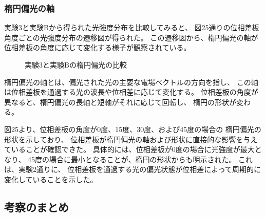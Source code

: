 \documentclass{article}
\begin{document}
\subsubsection*{楕円偏光の軸}
\begin{spacing}{1.2}
    実験3と実験Bから得られた光強度分布を比較してみると、
    図25通りの位相差板角度ごとの光強度分布の遷移図が得られた。
    この遷移図から、楕円偏光の軸が位相差板の角度に応じて変化する様子が観察されている。
    \begin{figure}[!htb] %
        \centering
        \caption{実験3と実験Bの楕円偏光の比較}
        \label{fig:25}
    \end{figure}
    \FloatBarrier
    楕円偏光の軸とは、偏光された光の主要な電場ベクトルの方向を指し、
    この軸は位相差板を通過する光の波長や位相差に応じて変化する。
    位相差板の角度が異なると、楕円偏光の長軸と短軸がそれに応じて回転し、
    楕円の形状が変わる。

    図25より、位相差板の角度が0度、15度、30度、および45度の場合の
    楕円偏光の形状を示しており、
    位相差板が楕円偏光の軸および形状に直接的な影響を与えていることが確認できた。
    具体的には、位相差板が0度の場合に光強度が最大となり、
    45度の場合に最小となることが、楕円の形状からも明示された。
    これは、実験2通りに、
    位相差板を通過する光の偏光状態が位相差によって周期的に変化していることを示した。
\end{spacing}

\subsection{考察のまとめ}
\end{document}
